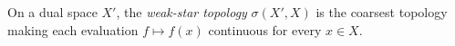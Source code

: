
On a dual space $X'$, the \emph{weak-star topology} $\sigma(X',X)$ is the coarsest topology making each evaluation $f\mapsto f(x)$ continuous for every $x\in X$.
